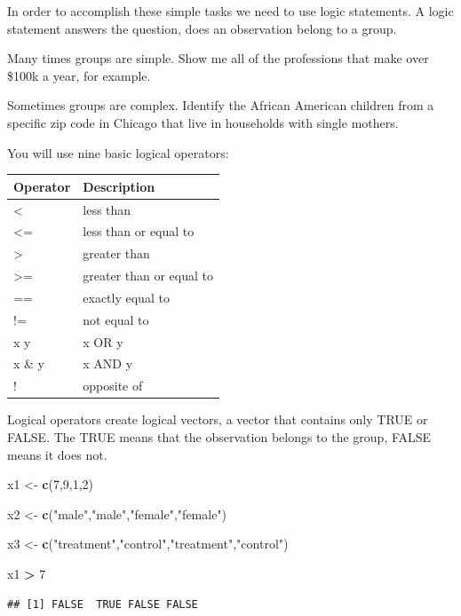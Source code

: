 \documentclass[]{book}
\newenvironment{Shaded}{\begin{snugshade}}{\end{snugshade}}
\newcommand{\DecValTok}[1]{\textcolor[rgb]{0.00,0.00,0.81}{#1}}
\newcommand{\KeywordTok}[1]{\textcolor[rgb]{0.13,0.29,0.53}{\textbf{#1}}}
\newcommand{\NormalTok}[1]{#1}
\newcommand{\OperatorTok}[1]{\textcolor[rgb]{0.81,0.36,0.00}{\textbf{#1}}}
\newcommand{\StringTok}[1]{\textcolor[rgb]{0.31,0.60,0.02}{#1}}
\theoremstyle{definition}
\theoremstyle{definition}
\theoremstyle{definition}
\theoremstyle{remark}
\begin{document}
In order to accomplish these simple tasks we need to use logic
statements. A logic statement answers the question, does an observation
belong to a group.

Many times groups are simple. Show me all of the professions that make
over \$100k a year, for example.

Sometimes groups are complex. Identify the African American children
from a specific zip code in Chicago that live in households with single
mothers.

You will use nine basic logical operators:

\begin{longtable}[]{@{}ll@{}}
\toprule
Operator & Description\tabularnewline
\midrule
\endhead
\textless{} & less than\tabularnewline
\textless{}= & less than or equal to\tabularnewline
\textgreater{} & greater than\tabularnewline
\textgreater{}= & greater than or equal to\tabularnewline
== & exactly equal to\tabularnewline
!= & not equal to\tabularnewline
x \textbar{} y & x OR y\tabularnewline
x \& y & x AND y\tabularnewline
! & opposite of\tabularnewline
\bottomrule
\end{longtable}

Logical operators create logical vectors, a vector that contains only
TRUE or FALSE. The TRUE means that the observation belongs to the group,
FALSE means it does not.

\begin{Shaded}
\begin{Highlighting}[]
\NormalTok{x1 <-}\StringTok{ }\KeywordTok{c}\NormalTok{(}\DecValTok{7}\NormalTok{,}\DecValTok{9}\NormalTok{,}\DecValTok{1}\NormalTok{,}\DecValTok{2}\NormalTok{)}

\NormalTok{x2 <-}\StringTok{ }\KeywordTok{c}\NormalTok{(}\StringTok{"male"}\NormalTok{,}\StringTok{"male"}\NormalTok{,}\StringTok{"female"}\NormalTok{,}\StringTok{"female"}\NormalTok{)}

\NormalTok{x3 <-}\StringTok{ }\KeywordTok{c}\NormalTok{(}\StringTok{"treatment"}\NormalTok{,}\StringTok{"control"}\NormalTok{,}\StringTok{"treatment"}\NormalTok{,}\StringTok{"control"}\NormalTok{)}

\NormalTok{x1 }\OperatorTok{>}\StringTok{ }\DecValTok{7}
\end{Highlighting}
\end{Shaded}

\begin{verbatim}
## [1] FALSE  TRUE FALSE FALSE
\end{verbatim}
\end{document}
